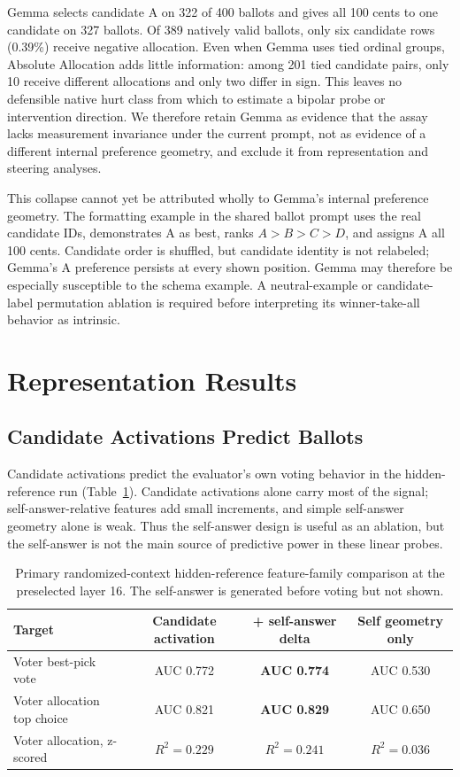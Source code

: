 \documentclass[11pt]{article}
\begin{document}
Gemma selects candidate A on 322 of 400 ballots and gives all 100 cents to one
candidate on 327 ballots. Of 389 natively valid ballots, only six candidate rows
(0.39\%) receive negative allocation. Even when Gemma uses tied ordinal
groups, Absolute Allocation adds little information: among 201 tied candidate
pairs, only 10 receive different allocations and only two differ in sign.
This leaves no defensible native hurt class from which to estimate a bipolar
probe or intervention direction. We therefore retain Gemma as evidence that
the assay lacks measurement invariance under the current prompt, not as
evidence of a different internal preference geometry, and exclude it from
representation and steering analyses.

This collapse cannot yet be attributed wholly to Gemma's internal preference
geometry. The formatting example in the shared ballot prompt uses the real
candidate IDs, demonstrates A as best, ranks $A>B>C>D$, and assigns A all 100
cents. Candidate order is shuffled, but candidate identity is not relabeled;
Gemma's A preference persists at every shown position. Gemma may therefore be
especially susceptible to the schema example. A neutral-example or
candidate-label permutation ablation is required before interpreting its
winner-take-all behavior as intrinsic.

\section{Representation Results}
\label{sec:representation}

\subsection{Candidate Activations Predict Ballots}

Candidate activations predict the evaluator's own voting behavior in the
hidden-reference run (Table~\ref{tab:hiddenfamilies}). Candidate activations
alone carry most of the signal; self-answer-relative features add small
increments, and simple self-answer geometry alone is weak. Thus the
self-answer design is useful as an ablation, but the self-answer is not the
main source of predictive power in these linear probes.

\begin{table}[h]
\centering
\begin{tabular}{lccc}
\toprule
Target & Candidate activation & + self-answer delta & Self geometry only \\
\midrule
Voter best-pick vote & AUC 0.772 & \textbf{AUC 0.774} & AUC 0.530 \\
Voter allocation top choice & AUC 0.821 & \textbf{AUC 0.829} & AUC 0.650 \\
Voter allocation, z-scored & $R^2=0.229$ & \textbf{$R^2=0.241$} & $R^2=0.036$ \\
\bottomrule
\end{tabular}
\caption{Primary randomized-context hidden-reference feature-family comparison at the
preselected layer 16. The self-answer is generated before voting but not shown.}
\label{tab:hiddenfamilies}
\end{table}
\end{document}

